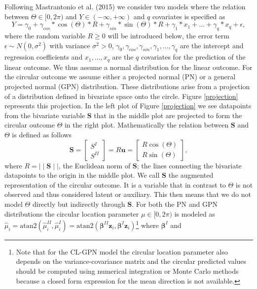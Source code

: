 \documentclass[man,mask]{apa6}
\let\rmarkdownfootnote\footnote%
\def\footnote{\protect\rmarkdownfootnote}
\begin{document}
Following Mastrantonio et al. (2015) we consider two models where
the relation between \(\Theta \in [0, 2\pi)\) and \(Y\in (-\infty, + \infty)\)
and \(q\) covariates is specified as
\begin{equation}\label{circlinlink}
Y = \gamma_0 + \gamma_{cos}*\cos(\Theta)*R + \gamma_{sin}*\sin(\Theta)*R + \gamma_1*x_1 + \dots + \gamma_q*x_q +  \epsilon,
\end{equation}
\noindent where the random variable \(R\geq0\) will be introduced below, the
error term \(\epsilon \sim N(0, \sigma^2)\) with variance \(\sigma^2>0\),
\(\gamma_0, \gamma_{cos}, \gamma_{sin}, \gamma_1, \dots, \gamma_q\) are the
intercept and regression coefficients and \(x_1, \dots, x_q\) are the \(q\)
covariates for the prediction of the linear outcome. We thus assume a normal
distribution for the linear outcome.\newline
\indent For the circular outcome we assume either a projected normal (PN) or a
general projected normal (GPN) distribution. These distributions arise from a
projection of a distribution defined in bivariate space onto the circle. Figure
\ref{projection} represents this projection. In the left plot of Figure
\ref{projection} we see datapoints from the bivariate variable
\(\boldsymbol{S}\) that in the middle plot are projected to form the circular
outcome \(\Theta\) in the right plot. Mathematically the relation between
\(\boldsymbol{S}\) and \(\Theta\) is defined as follows
\begin{equation}\label{projection}
\boldsymbol{S} = \begin{bmatrix} S^{I} \\ S^{II} \end{bmatrix} = R\boldsymbol{u} = \begin{bmatrix} R \cos (\Theta) \\  R\sin (\Theta) \end{bmatrix},
\end{equation}
\noindent where \(R = \mid\mid \boldsymbol{S} \mid\mid\), the Euclidean norm of
\(\boldsymbol{S}\); the lines connecting the bivariate datapoints to the origin
in the middle plot. We call \(\boldsymbol{S}\) the augmented representation of the
circular outcome. It is a variable that in contrast to \(\Theta\) is not
observed and thus considered latent or auxiliary. This then means that we do not
model \(\Theta\) directly but indirectly through \(\boldsymbol{S}\). \newline
\indent For both the PN and GPN distributions the circular location parameter
\(\mu\in [0, 2\pi)\) is modeled as \(\hat{\mu}_i = \mbox{atan2}(\hat{\mu}_i^{II}, \hat{\mu}_i^{I}) = \mbox{atan2}(\boldsymbol{\beta}^{II}\boldsymbol{z}_i, \boldsymbol{\beta}^{I}\boldsymbol{z}_i)\)\footnote{Note that for the CL-GPN
model the circular location parameter also depends on the variance-covariance
matrix and the circular predicted values should be computed using numerical
integration or Monte Carlo methods because a closed form expression for the mean
direction is not available.} where \(\boldsymbol{\beta}^{I}\) and
\end{document}
